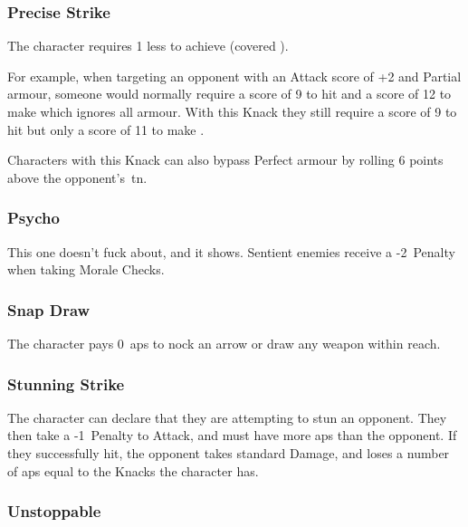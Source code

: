 \begin{multicols}{2}
\subsubsection{Precise Strike}\label{precisestrike}

The character requires 1 less to achieve  (covered ).

\begin{exampletext}
  For example, when targeting an opponent with an Attack score of +2 and Partial armour, someone would normally require a score of 9 to hit and a score of 12 to make  which ignores all armour.
  With this Knack they still require a score of 9 to hit but only a score of 11 to make .
\end{exampletext}

Characters with this Knack can also bypass Perfect armour by rolling 6 points above the opponent's~\gls{tn}.

\subsubsection{Psycho}

This one doesn't fuck about, and it shows.
Sentient enemies receive a -2~Penalty when taking Morale Checks.%

\subsubsection{Snap Draw}
\label{snapDraw}

The character pays 0~\glspl{ap} to nock an arrow or draw any \gls{weapon} within reach.

\subsubsection{Stunning Strike}\label{stunningstrike}

The character can declare that they are attempting to stun an opponent.
They then take a -1~Penalty to Attack, and must have more \glspl{ap} than the opponent.
If they successfully hit, the opponent takes standard Damage, and loses a number of \glspl{ap} equal to the Knacks the character has.

\subsubsection{Unstoppable}


\end{multicols}
